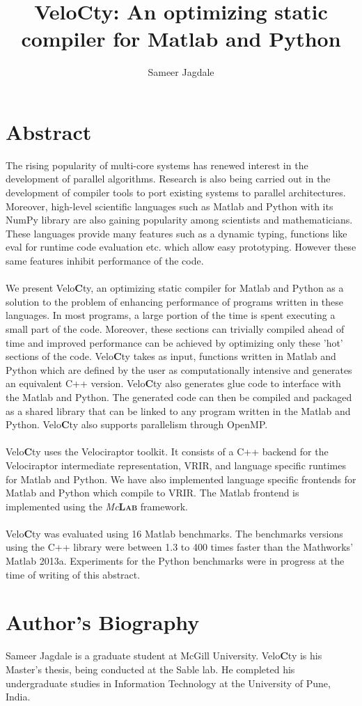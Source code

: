 \documentclass[a4paper, 12pt]{article}
\newcommand{\matlab}{{\textsc Matlab}\xspace}
\newcommand{\velocty}{{Velo\textbf{C}ty}\xspace}
\newcommand{\smclab}{\textrm{\textsl{Mc}\textbf{\textsc{Lab}}}}
\newcommand{\mclab}{\smclab\xspace}
\begin{document}
\title{\velocty : An optimizing static compiler for \matlab and Python}
\author[1]{Sameer Jagdale}
\maketitle
\section*{Abstract}
The rising popularity of multi-core systems has renewed interest in the development of parallel algorithms. Research is also being carried out in the development of compiler tools to port existing systems to parallel architectures. Moreover, high-level scientific languages such as \matlab and Python with its NumPy library are also gaining popularity among scientists and mathematicians. These languages provide many features such as a dynamic typing, functions like eval for runtime code evaluation etc. which allow easy prototyping. However these same features inhibit performance of the code. \\ \\
We present \velocty, an optimizing static compiler for \matlab and Python as a solution to the problem of enhancing performance of programs written in these languages. In most programs, a large portion of the time is spent executing a small part of the code. Moreover, these sections can trivially compiled ahead of time and improved performance can be achieved by optimizing only these 'hot' sections of the code. \velocty takes as input, functions written in \matlab and Python which are defined by the user as computationally intensive and generates an equivalent C++ version. \velocty also generates glue code to interface with the \matlab and Python. The generated code can then be compiled and packaged as a shared library that can be linked to any program written in the \matlab and Python. \velocty also supports parallelism through OpenMP.\\ \\
\velocty uses the Velociraptor toolkit. It consists of a C++ backend for the Velociraptor intermediate representation, VRIR, and language specific runtimes for \matlab and Python. We have also implemented language specific frontends for \matlab and Python which compile to VRIR. The \matlab frontend is implemented using the \mclab framework. \\ \\
\velocty was evaluated using 16 \matlab benchmarks. The benchmarks versions using the C++ library were between 1.3 to 400 times faster than the Mathworks' \matlab2013a. Experiments for the Python benchmarks were in progress at the time of writing of this abstract.
\section*{Author's Biography}
Sameer Jagdale is a graduate student at McGill University. \velocty is his Master's thesis, being conducted at the Sable lab. He completed his undergraduate studies in Information Technology at the University of Pune, India.
\end{document}
